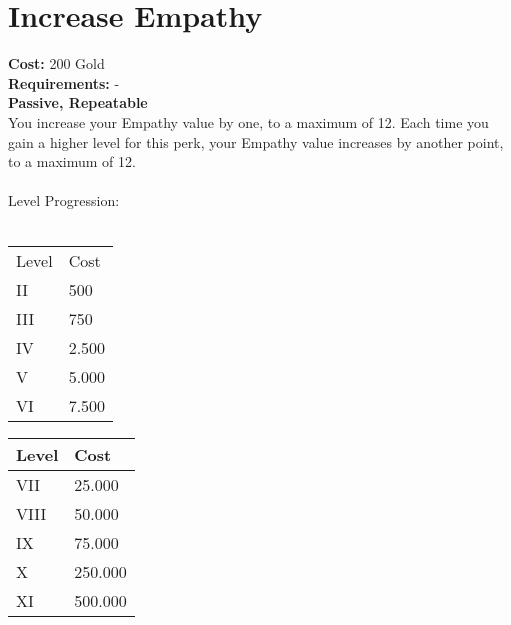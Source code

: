 \section*{Increase Empathy}\label{sec:increaseempathy}
\textbf{Cost:} 200 Gold\\
\textbf{Requirements:} -\\
\textbf{Passive, Repeatable}\\
You increase your Empathy value by one, to a maximum of 12.
Each time you gain a higher level for this perk, your Empathy value increases by another point, to a maximum of 12.\\
\\
Level Progression:\\
\\
\begin{minipage}{0.5\textwidth}
    \begin{tabular}{l | l}
        Level & Cost\\
        II & 500\\
        III & 750\\
        IV & 2.500\\
        V & 5.000\\
        VI & 7.500\\
    \end{tabular}
\end{minipage}
\begin{minipage}{0.5\textwidth}
    \begin{tabular}{l | l}
        Level & Cost\\ \hline
        VII & 25.000\\
        VIII & 50.000\\
        IX & 75.000\\
        X & 250.000\\
        XI & 500.000\\
    \end{tabular}
\end{minipage}